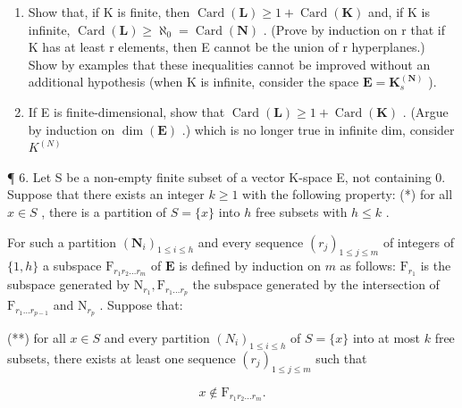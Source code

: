\begin{enumerate}
\def\labelenumi{(\alph{enumi})}
\item
  Show that, if K is finite, then \(\operatorname{Card}(\mathbf{L}) \geqslant 1 + \operatorname{Card}(\mathbf{K})\) and, if K is infinite, \(\operatorname{Card}(\mathbf{L}) \geqslant \aleph_{0} = \operatorname{Card}(\mathbf{N})\) . (Prove by induction on r that if K has at least r elements, then E cannot be the union of r hyperplanes.) Show by examples that these inequalities cannot be improved without an additional hypothesis (when K is infinite, consider the space \(\mathbf{E} = \mathbf{K}_{s}^{(\mathbf{N})}\) ).
\item
  If E is finite-dimensional, show that \(\operatorname{Card}(\mathbf{L}) \geqslant 1 + \operatorname{Card}(\mathbf{K})\) . (Argue by induction on \(\dim(\mathbf{E})\) .) which is no longer true in infinite dim, consider \(K^{(N)}\)
\end{enumerate}

¶ 6. Let S be a non-empty finite subset of a vector K-space E, not containing 0. Suppose that there exists an integer \(k \geqslant 1\) with the following property: (*) for all \(x \in S\) , there is a partition of \(S = \{x\}\) into \(h\) free subsets with \(h \leqslant k\) .

For such a partition \((\mathbf{N}_i)_{1\leqslant i\leqslant h}\) and every sequence \((r_j)_{1\leqslant j\leqslant m}\) of integers of \(\{1,h\}\) a subspace \(\mathrm{F}_{r_1r_2\dots r_m}\) of \(\mathbf{E}\) is defined by induction on \(m\) as follows: \(\mathrm{F}_{r_1}\) is the subspace generated by \(\mathrm{N}_{r_1},\mathrm{F}_{r_1\dots r_p}\) the subspace generated by the intersection of \(\mathrm{F}_{r_1\dots r_{p-1}}\) and \(\mathrm{N}_{r_p}\) . Suppose that:

(**) for all \(x \in S\) and every partition \((N_i)_{1 \leqslant i \leqslant h}\) of \(S = \{x\}\) into at most \(k\) free subsets, there exists at least one sequence \((r_j)_{1 \leqslant j \leqslant m}\) such that

\[
x \notin \mathrm{F} _ {r _ {1} r _ {2} \dots r _ {m}}.
\]

